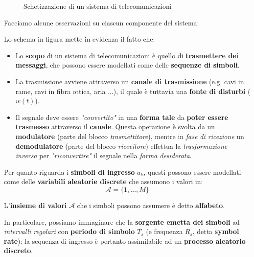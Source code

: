 \begin{figure}[!ht]
    \caption{Schetizzazione di un sistema di telecomunicazioni}
    \label{fig:08_01_SchemaSistemaTelecom}
\end{figure}

Facciamo alcune osservazioni su ciascun componente del sistema:

\begin{remark}
    Lo schema in figura mette in evidenza il fatto che:
    \begin{itemize}
        \item Lo \textbf{scopo} di un sistema di telecomunicazioni è quello di
            \textbf{trasmettere dei messaggi}, che possono essere modellati come
            delle \textbf{sequenze di simboli}.
        \item La trasmissione avviene attraverso un \textbf{canale di trasmissione}
            (e.g. cavi in rame, cavi in fibra ottica, aria ...), il quale è
            tuttavia una \textbf{fonte di disturbi} ($w(t)$).
        \item Il segnale deve essere \textit{"convertito"} in una \textbf{forma tale}
            da \textbf{poter essere trasmesso} attraverso il \textbf{canale}.
            Questa operazione è svolta da un \textbf{modulatore} (parte del blocco
            \textit{trasmettitore}), mentre in \textit{fase di ricezione} un 
            \textbf{demodulatore} (parte del blocco \textit{ricevitore}) effettua
            la \textit{trasformazione inversa} per \textit{"riconvertire"}
            il segnale nella \textit{forma desiderata}.
    \end{itemize}
\end{remark}

Per quanto riguarda i \textbf{simboli di ingresso} $a_k$, questi possono 
essere modellati come delle \textbf{variabili aleatorie discrete} 
che assumono i valori in:
\[
    \mathcal{A} = \{1,\ldots , M\}  
\]

\begin{definition}[ALFABETO]
    L'\textbf{insieme di valori} $\mathcal{A}$ che i simboli possono assumere
    è detto \textbf{alfabeto}.
\end{definition}

In particolare, possiamo immaginare che la \textbf{sorgente emetta dei simboli}
ad \textit{intervalli regolari} con \textbf{periodo di simbolo} $T_s$ (e frequenza $R_s$, detta
\textbf{symbol rate}): la sequenza di ingresso è pertanto assimilabile ad 
un \textbf{processo aleatorio discreto}.

